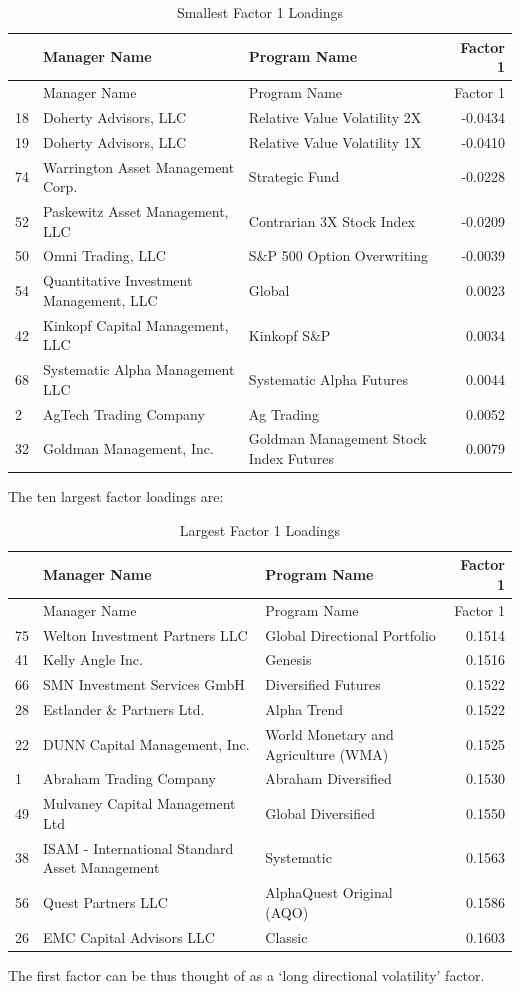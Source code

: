 \documentclass[]{article}
\begin{document}
\begin{longtable}[c]{@{}lllr@{}}
\caption{Smallest Factor 1 Loadings}\tabularnewline
\toprule
& Manager Name & Program Name & Factor 1\tabularnewline
\midrule
\endfirsthead
\toprule
& Manager Name & Program Name & Factor 1\tabularnewline
\midrule
\endhead
18 & Doherty Advisors, LLC & Relative Value Volatility 2X &
-0.0434\tabularnewline
19 & Doherty Advisors, LLC & Relative Value Volatility 1X &
-0.0410\tabularnewline
74 & Warrington Asset Management Corp. & Strategic Fund &
-0.0228\tabularnewline
52 & Paskewitz Asset Management, LLC & Contrarian 3X Stock Index &
-0.0209\tabularnewline
50 & Omni Trading, LLC & S\&P 500 Option Overwriting &
-0.0039\tabularnewline
54 & Quantitative Investment Management, LLC & Global &
0.0023\tabularnewline
42 & Kinkopf Capital Management, LLC & Kinkopf S\&P &
0.0034\tabularnewline
68 & Systematic Alpha Management LLC & Systematic Alpha Futures &
0.0044\tabularnewline
2 & AgTech Trading Company & Ag Trading & 0.0052\tabularnewline
32 & Goldman Management, Inc. & Goldman Management Stock Index Futures &
0.0079\tabularnewline
\bottomrule
\end{longtable}

The ten largest factor loadings are:

\begin{longtable}[c]{@{}lllr@{}}
\caption{Largest Factor 1 Loadings}\tabularnewline
\toprule
& Manager Name & Program Name & Factor 1\tabularnewline
\midrule
\endfirsthead
\toprule
& Manager Name & Program Name & Factor 1\tabularnewline
\midrule
\endhead
75 & Welton Investment Partners LLC & Global Directional Portfolio &
0.1514\tabularnewline
41 & Kelly Angle Inc. & Genesis & 0.1516\tabularnewline
66 & SMN Investment Services GmbH & Diversified Futures &
0.1522\tabularnewline
28 & Estlander \& Partners Ltd. & Alpha Trend & 0.1522\tabularnewline
22 & DUNN Capital Management, Inc. & World Monetary and Agriculture
(WMA) & 0.1525\tabularnewline
1 & Abraham Trading Company & Abraham Diversified &
0.1530\tabularnewline
49 & Mulvaney Capital Management Ltd & Global Diversified &
0.1550\tabularnewline
38 & ISAM - International Standard Asset Management & Systematic &
0.1563\tabularnewline
56 & Quest Partners LLC & AlphaQuest Original (AQO) &
0.1586\tabularnewline
26 & EMC Capital Advisors LLC & Classic & 0.1603\tabularnewline
\bottomrule
\end{longtable}

The first factor can be thus thought of as a `long directional
volatility' factor.
\end{document}
